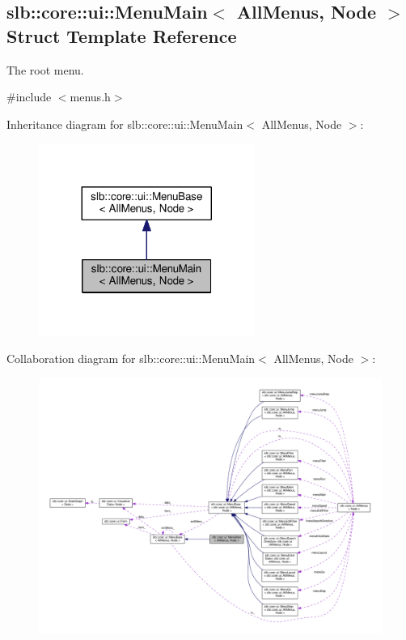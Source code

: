 \hypertarget{structslb_1_1core_1_1ui_1_1MenuMain}{}\subsection{slb\+:\+:core\+:\+:ui\+:\+:Menu\+Main$<$ All\+Menus, Node $>$ Struct Template Reference}
\label{structslb_1_1core_1_1ui_1_1MenuMain}


The root menu.  




{\ttfamily \#include $<$menus.\+h$>$}



Inheritance diagram for slb\+:\+:core\+:\+:ui\+:\+:Menu\+Main$<$ All\+Menus, Node $>$\+:\nopagebreak
\begin{figure}[H]
\begin{center}
\leavevmode
\includegraphics[width=200pt]{structslb_1_1core_1_1ui_1_1MenuMain__inherit__graph}
\end{center}
\end{figure}


Collaboration diagram for slb\+:\+:core\+:\+:ui\+:\+:Menu\+Main$<$ All\+Menus, Node $>$\+:\nopagebreak
\begin{figure}[H]
\begin{center}
\leavevmode
\includegraphics[width=350pt]{structslb_1_1core_1_1ui_1_1MenuMain__coll__graph}
\end{center}
\end{figure}
